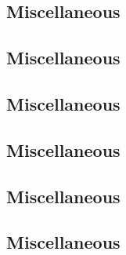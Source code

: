 \vspace{-.7\baselineskip}\hrulefill
\vspace{0.1\baselineskip}\subsection{Miscellaneous}
\raggedbottom
\vspace{-.7\baselineskip}\hrulefill
\vspace{0.1\baselineskip}\subsection{Miscellaneous}
\raggedbottom
\vspace{-.7\baselineskip}\hrulefill
\vspace{0.1\baselineskip}\subsection{Miscellaneous}
\raggedbottom
\vspace{-.7\baselineskip}\hrulefill
\vspace{0.1\baselineskip}\subsection{Miscellaneous}
\raggedbottom
\vspace{-.7\baselineskip}\hrulefill
\vspace{0.1\baselineskip}\subsection{Miscellaneous}
\raggedbottom
\vspace{-.7\baselineskip}\hrulefill
\vspace{0.1\baselineskip}\subsection{Miscellaneous}
\raggedbottom
\vspace{-.7\baselineskip}\hrulefill
\vspace{0.1\baselineskip}
